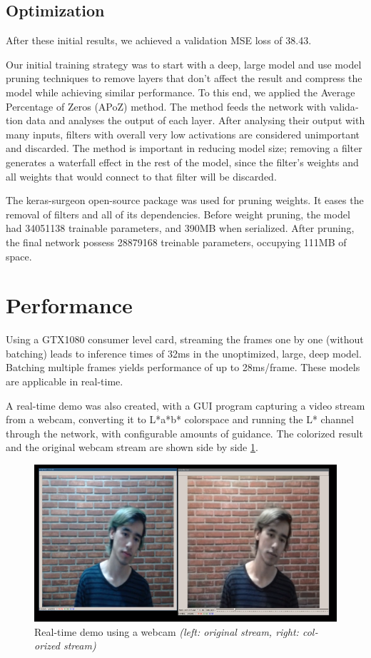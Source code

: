 \documentclass[12pt,openright,oneside,a4paper,english]{abntex2}
\begin{document}
\begin{otherlanguage}{english}
\subsection{Optimization}
After these initial results, we achieved a validation MSE loss of 38.43.

Our initial training strategy was to start with a deep, large model and use model pruning techniques to remove layers that don't affect the result and compress the model while achieving similar performance. To this end, we applied the Average Percentage of Zeros (APoZ) method. The method feeds the network with validation data and analyses the output of each layer. After analysing their output with many inputs, filters with overall very low activations are considered unimportant and discarded. The method is important in reducing model size; removing a filter generates a waterfall effect in the rest of the model, since the filter's weights and all weights that would connect to that filter will be discarded.

The keras-surgeon \cite{keras_surgeon} open-source package was used for pruning weights. It eases the removal of filters and all of its dependencies. Before weight pruning, the model had 34051138 trainable parameters, and 390MB when serialized. After pruning, the final network possess 28879168 treinable parameters, occupying 111MB of space.

\section{Performance}
Using a GTX1080 consumer level card, streaming the frames one by one (without batching) leads to inference times of 32ms in the unoptimized, large, deep model. Batching multiple frames yields performance of up to 28ms/frame. These models are applicable in real-time.

A real-time demo was also created, with a GUI program capturing a video stream from a webcam, converting it to L*a*b* colorspace and running the L* channel through the network, with configurable amounts of guidance. The colorized result and the original webcam stream are shown side by side \ref{fig:webcam}.

\begin{figure}[H]
\centering
\includegraphics[width=\textwidth+20pt]{webcam}
\caption{Real-time demo using a webcam \textit{(left: original stream, right: colorized stream)}}
\label{fig:webcam}
\end{figure}


\end{otherlanguage}
\end{document}

